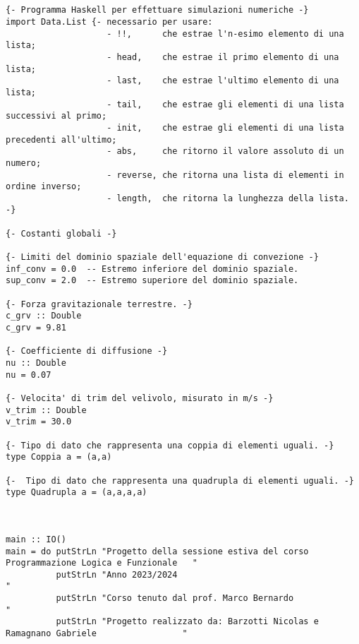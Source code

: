 \scriptsize
\begin{verbatim}
   

{- Programma Haskell per effettuare simulazioni numeriche -}
import Data.List {- necessario per usare: 
                    - !!,      che estrae l'n-esimo elemento di una lista;
                    - head,    che estrae il primo elemento di una lista;
                    - last,    che estrae l'ultimo elemento di una lista; 
                    - tail,    che estrae gli elementi di una lista successivi al primo;
                    - init,    che estrae gli elementi di una lista precedenti all'ultimo;
                    - abs,     che ritorno il valore assoluto di un numero;
                    - reverse, che ritorna una lista di elementi in ordine inverso;
                    - length,  che ritorna la lunghezza della lista. -}

{- Costanti globali -}

{- Limiti del dominio spaziale dell'equazione di convezione -}
inf_conv = 0.0  -- Estremo inferiore del dominio spaziale.
sup_conv = 2.0  -- Estremo superiore del dominio spaziale.

{- Forza gravitazionale terrestre. -}
c_grv :: Double
c_grv = 9.81 

{- Coefficiente di diffusione -}
nu :: Double
nu = 0.07  

{- Velocita' di trim del velivolo, misurato in m/s -}
v_trim :: Double
v_trim = 30.0     

{- Tipo di dato che rappresenta una coppia di elementi uguali. -}
type Coppia a = (a,a)

{-  Tipo di dato che rappresenta una quadrupla di elementi uguali. -}
type Quadrupla a = (a,a,a,a)



main :: IO()
main = do putStrLn "Progetto della sessione estiva del corso Programmazione Logica e Funzionale   "
          putStrLn "Anno 2023/2024                                                                "
          putStrLn "Corso tenuto dal prof. Marco Bernardo                                         "
          putStrLn "Progetto realizzato da: Barzotti Nicolas e Ramagnano Gabriele                 "
          

\end{verbatim}
